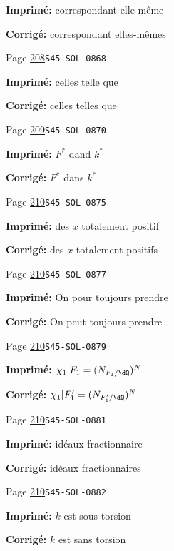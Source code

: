 \begin{description}
\par\noindent\textbf{Imprimé:} correspondant elle-même
\par\noindent\textbf{Corrigé:} correspondant elles-mêmes
\smallskip
\item[\hypertarget{apparatus:FR-0210}{210}] Page \hyperlink{printpage:fr:208}{208}\quad\texttt{S45-SOL-0868}
\par\noindent\textbf{Imprimé:} celles telle que
\par\noindent\textbf{Corrigé:} celles telles que
\smallskip
\item[\hypertarget{apparatus:FR-0211}{211}] Page \hyperlink{printpage:fr:209}{209}\quad\texttt{S45-SOL-0870}
\par\noindent\textbf{Imprimé:} $F^\ast$ dand $k^\ast$
\par\noindent\textbf{Corrigé:} $F^\ast$ dans $k^\ast$
\smallskip
\item[\hypertarget{apparatus:FR-0212}{212}] Page \hyperlink{printpage:fr:210}{210}\quad\texttt{S45-SOL-0875}
\par\noindent\textbf{Imprimé:} des $x$ totalement positif
\par\noindent\textbf{Corrigé:} des $x$ totalement positifs
\smallskip
\item[\hypertarget{apparatus:FR-0213}{213}] Page \hyperlink{printpage:fr:210}{210}\quad\texttt{S45-SOL-0877}
\par\noindent\textbf{Imprimé:} On pour toujours prendre
\par\noindent\textbf{Corrigé:} On peut toujours prendre
\smallskip
\item[\hypertarget{apparatus:FR-0214}{214}] Page \hyperlink{printpage:fr:210}{210}\quad\texttt{S45-SOL-0879}
\par\noindent\textbf{Imprimé:} \(\chi_1|F_1=(N_{F_1/\dQ})^N\)
\par\noindent\textbf{Corrigé:} \(\chi_1|F_1'=(N_{F_1'/\dQ})^N\)
\smallskip
\item[\hypertarget{apparatus:FR-0215}{215}] Page \hyperlink{printpage:fr:210}{210}\quad\texttt{S45-SOL-0881}
\par\noindent\textbf{Imprimé:} idéaux fractionnaire
\par\noindent\textbf{Corrigé:} idéaux fractionnaires
\smallskip
\item[\hypertarget{apparatus:FR-0216}{216}] Page \hyperlink{printpage:fr:210}{210}\quad\texttt{S45-SOL-0882}
\par\noindent\textbf{Imprimé:} $k$ est sous torsion
\par\noindent\textbf{Corrigé:} $k$ est sans torsion

\end{description}
